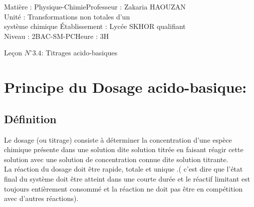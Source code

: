 \documentclass[12pt]{article}
\author{Zakaria HAOUZAN}
\date{\today}
\newcommand\headerMe[2]{\noindent{}#1\hfill#2}
\begin{document}
\headerMe{Matière : Physique-Chimie}{Professeur : Zakaria HAOUZAN}\\
\headerMe{Unité : Transformations non totales d'un\\système chimique  }{Établissement : Lycée SKHOR qualifiant}\\
\headerMe{Niveau : 2BAC-SM-PC}{Heure : 3H}\\







\begin{center}

    \Large{Leçon $N^{\circ} 3.4 $: \color{red} Titrages acido-basiques }
\end{center}

\section{Principe du Dosage acido-basique:}
\subsection{Définition}
Le dosage (ou titrage) consiste à déterminer la concentration d'une espèce chimique présente dans une solution dite solution titrée
en faisant réagir cette solution avec une solution de concentration connue dite solution titrante.
\\La réaction du dosage doit être rapide, totale et unique .( c'est dire que l'état final du système doit être atteint dans une courte durée
et le réactif limitant est toujours entièrement consommé et la réaction ne doit pas être en compétition avec d'autres réactions).
\end{document}
